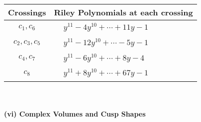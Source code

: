 \documentclass[1p]{elsarticle_modified}
\theoremstyle{definition}
\begin{document}
\begin{tabular}{m{50pt}|m{274pt}}
Crossings & \hspace{64pt}Riley Polynomials at each crossing \\
\hline $$\begin{aligned}c_{1},c_{6}\end{aligned}$$&$\begin{aligned}
&y^{11}-4 y^{10}+\cdots+11 y-1
\end{aligned}$\\
\hline $$\begin{aligned}c_{2},c_{3},c_{5}\end{aligned}$$&$\begin{aligned}
&y^{11}-12 y^{10}+\cdots-5 y-1
\end{aligned}$\\
\hline $$\begin{aligned}c_{4},c_{7}\end{aligned}$$&$\begin{aligned}
&y^{11}-6 y^{10}+\cdots+8 y-4
\end{aligned}$\\
\hline $$\begin{aligned}c_{8}\end{aligned}$$&$\begin{aligned}
&y^{11}+8 y^{10}+\cdots+67 y-1
\end{aligned}$\\
\hline
\end{tabular}\\~\\
\newpage\flushleft \textbf{(vi) Complex Volumes and Cusp Shapes}
\end{document}
